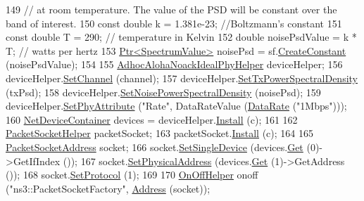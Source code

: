 \begin{DoxyCode}
149   \textcolor{comment}{// at room temperature. The value of the PSD will be constant over the band of interest.}
150   \textcolor{keyword}{const} \textcolor{keywordtype}{double} k = 1.381e-23; \textcolor{comment}{//Boltzmann's constant}
151   \textcolor{keyword}{const} \textcolor{keywordtype}{double} T = 290; \textcolor{comment}{// temperature in Kelvin}
152   \textcolor{keywordtype}{double} noisePsdValue = k * T; \textcolor{comment}{// watts per hertz}
153   \hyperlink{classns3_1_1Ptr}{Ptr<SpectrumValue>} noisePsd = sf.\hyperlink{classns3_1_1WifiSpectrumValue5MhzFactory_a32a04dc83a836da0fcfcc387cabc097f}{CreateConstant} (noisePsdValue);
154 
155   \hyperlink{classns3_1_1AdhocAlohaNoackIdealPhyHelper}{AdhocAlohaNoackIdealPhyHelper} deviceHelper;
156   deviceHelper.\hyperlink{classns3_1_1AdhocAlohaNoackIdealPhyHelper_a9d2c05e23d722e63dafa2d083313ecdb}{SetChannel} (channel);
157   deviceHelper.\hyperlink{classns3_1_1AdhocAlohaNoackIdealPhyHelper_a3acada700018db8e04a7a209e4cdf94e}{SetTxPowerSpectralDensity} (txPsd);
158   deviceHelper.\hyperlink{classns3_1_1AdhocAlohaNoackIdealPhyHelper_a6a5f5df28a9bddbe04e8e4815bdce244}{SetNoisePowerSpectralDensity} (noisePsd);
159   deviceHelper.\hyperlink{classns3_1_1AdhocAlohaNoackIdealPhyHelper_a073f6728abd6e3880475b29cbc415792}{SetPhyAttribute} (\textcolor{stringliteral}{"Rate"}, DataRateValue (\hyperlink{classns3_1_1DataRate}{DataRate} (\textcolor{stringliteral}{"1Mbps"})));
160   \hyperlink{classns3_1_1NetDeviceContainer}{NetDeviceContainer} devices = deviceHelper.\hyperlink{classns3_1_1AdhocAlohaNoackIdealPhyHelper_a0b9cb9d602fd1027f7f39a776e745abe}{Install} (c);
161 
162   \hyperlink{classns3_1_1PacketSocketHelper}{PacketSocketHelper} packetSocket;
163   packetSocket.\hyperlink{classns3_1_1PacketSocketHelper_a33f449fee7fd10411949d17feba6d33e}{Install} (c);
164 
165   \hyperlink{classns3_1_1PacketSocketAddress}{PacketSocketAddress} socket;
166   socket.\hyperlink{classns3_1_1PacketSocketAddress_ad1caa016f4d27c9d5f2c06dbfc53f8a3}{SetSingleDevice} (devices.\hyperlink{classns3_1_1NetDeviceContainer_a677d62594b5c9d2dea155cc5045f4d0b}{Get} (0)->GetIfIndex ());
167   socket.\hyperlink{classns3_1_1PacketSocketAddress_a9452f9410a97e57344e464e25c2ab0f3}{SetPhysicalAddress} (devices.\hyperlink{classns3_1_1NetDeviceContainer_a677d62594b5c9d2dea155cc5045f4d0b}{Get} (1)->GetAddress ());
168   socket.\hyperlink{classns3_1_1PacketSocketAddress_a9020962e39c238277f3b2f0de605647a}{SetProtocol} (1);
169 
170   \hyperlink{classns3_1_1OnOffHelper}{OnOffHelper} onoff (\textcolor{stringliteral}{"ns3::PacketSocketFactory"}, \hyperlink{classns3_1_1Address}{Address} (socket));

\end{DoxyCode}
